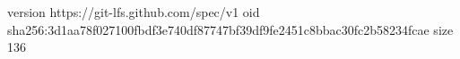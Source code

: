 version https://git-lfs.github.com/spec/v1
oid sha256:3d1aa78f027100fbdf3e740df87747bf39df9fe2451c8bbac30fc2b58234fcae
size 136
